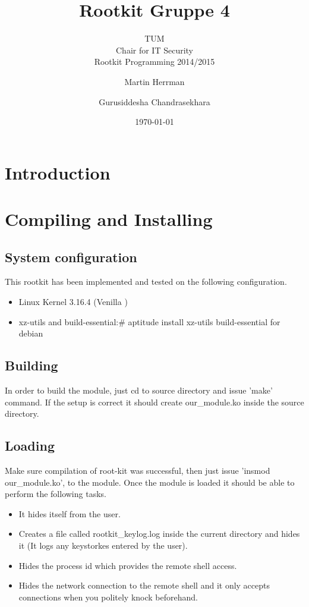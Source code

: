 \documentclass[10pt, letterpaper]{scrartcl}
\title{Rootkit Gruppe 4}
\subtitle{TUM \\Chair for IT Security\\  Rootkit Programming 2014/2015}
\author{Martin Herrman \and Gurusiddesha Chandrasekhara}
\date{\today}
\begin{document}
\maketitle
\tableofcontents
\newpage

\section{Introduction}
\section{Compiling and Installing}
\subsection{System configuration}
This rootkit has been implemented and tested on the following configuration.
\begin{itemize}
    \item Linux Kernel 3.16.4 (Venilla )
    \item xz-utils and build-essential:\# aptitude install xz-utils build-essential for debian 
\end{itemize}

    \subsection{Building}
        In order to build the module, just cd to source directory and issue 'make' command. If the setup is correct it should create our\_module.ko inside the source directory. 
    \subsection{Loading}
        Make sure compilation of root-kit was successful, then just issue 'insmod our\_module.ko', to the module. Once the module is loaded it should be able to perform the following tasks. 
    \begin{itemize}
    \item It hides itself from the user. 
    \item Creates a  file called rootkit\_keylog.log inside the current directory and hides it (It logs any keystorkes entered by the user).
    \item Hides the process id which provides the remote shell access. 
    \item Hides the network connection to the remote shell and it only accepts connections when you politely knock beforehand.
    \end{itemize}
\end{document}
